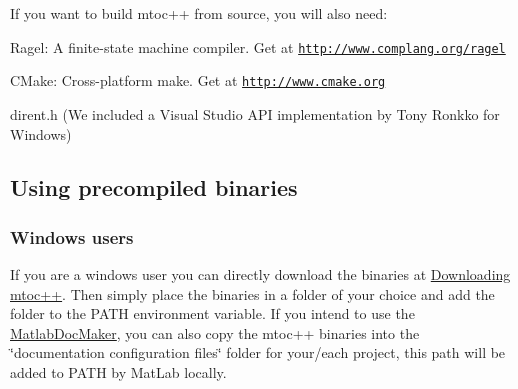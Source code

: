 If you want to build mtoc++ from source, you will also need\+:
\begin{DoxyItemize}
\item Ragel\+: A finite-\/state machine compiler. Get at \href{http://www.complang.org/ragel}{\tt http\+://www.\+complang.\+org/ragel}
\item C\+Make\+: Cross-\/platform make. Get at \href{http://www.cmake.org}{\tt http\+://www.\+cmake.\+org}
\item dirent.\+h (We included a Visual Studio A\+P\+I implementation by Tony Ronkko for Windows)
\end{DoxyItemize}\hypertarget{install_inst_binaries}{}\subsection{Using precompiled binaries}\label{install_inst_binaries}
\hypertarget{install_inst_binaries_win}{}\subsubsection{Windows users}\label{install_inst_binaries_win}
If you are a windows user you can directly download the binaries at \hyperlink{download}{Downloading mtoc++}. Then simply place the binaries in a folder of your choice and add the folder to the P\+A\+T\+H environment variable. If you intend to use the \hyperlink{class_matlab_doc_maker}{Matlab\+Doc\+Maker}, you can also copy the mtoc++ binaries into the \char`\"{}documentation configuration files\char`\"{} folder for your/each project, this path will be added to P\+A\+T\+H by Mat\+Lab locally.

